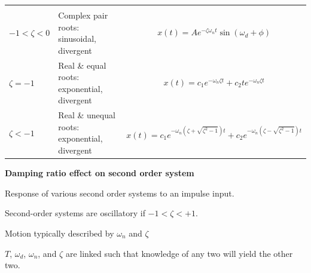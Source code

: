 \documentclass[
]{book}
\begin{document}
\begin{longtable}[]{@{}lll@{}}
\begin{minipage}[t]{0.39\columnwidth}
\end{minipage}\tabularnewline
\begin{minipage}[t]{0.13\columnwidth}\raggedright
\(-1 \lt \zeta \lt 0\)\strut
\end{minipage} & \begin{minipage}[t]{0.39\columnwidth}\raggedright
Complex pair roots: sinusoidal, divergent\strut
\end{minipage} & \begin{minipage}[t]{0.39\columnwidth}\raggedright
\[ x\left(t\right) =  A e^{-\zeta \omega_n t} \sin \left( \omega_d + \phi \right) \]\strut
\end{minipage}\tabularnewline
\begin{minipage}[t]{0.13\columnwidth}\raggedright
\(\zeta = -1\)\strut
\end{minipage} & \begin{minipage}[t]{0.39\columnwidth}\raggedright
Real \& equal roots: exponential, divergent\strut
\end{minipage} & \begin{minipage}[t]{0.39\columnwidth}\raggedright
\[ x\left(t\right) = c_1 e^{-\omega_n \zeta t} + c_2 t e^{-\omega_n \zeta t} \]\strut
\end{minipage}\tabularnewline
\begin{minipage}[t]{0.13\columnwidth}\raggedright
\(\zeta \lt -1\)\strut
\end{minipage} & \begin{minipage}[t]{0.39\columnwidth}\raggedright
Real \& unequal roots: exponential, divergent\strut
\end{minipage} & \begin{minipage}[t]{0.39\columnwidth}\raggedright
\[ x\left(t\right) = c_1 e^{-\omega_n \left( \zeta + \sqrt{\zeta^2 - 1} \right)t} + c_2 e^{-\omega_n \left( \zeta - \sqrt{\zeta^2 - 1} \right)t} \]\strut
\end{minipage}\tabularnewline
\bottomrule
\end{longtable}

\textbf{Damping ratio effect on second order system}

Response of various second order systems to an impulse input.

Second-order systems are oscillatory if \(-1 \lt \zeta \lt +1\).

Motion typically described by \(\omega_n\) and \(\zeta\)

\(T\), \(\omega_d\), \(\omega_n\), and \(\zeta\) are linked such that knowledge of any two will yield the other two.
\end{document}
